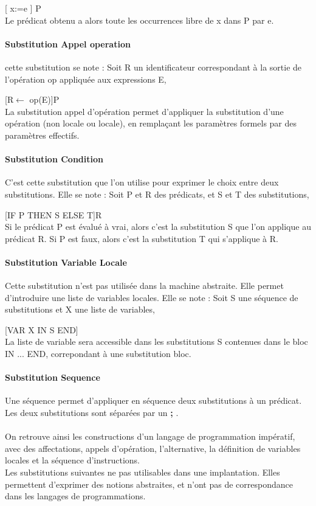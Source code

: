 [ x:=e ] P \\
Le prédicat obtenu a alors toute les occurrences libre de x dans P par e.

\paragraph{Substitution Appel operation}
cette substitution se note : Soit R un identificateur correspondant à la sortie
de l'opération op appliquée aux expressions E, 

[R$\leftarrow$ op(E)]P\\
La  substitution appel d’opération permet d’appliquer la substitution
d’une opération (non locale ou locale), en remplaçant les paramètres
formels par des paramètres effectifs. 

\paragraph{Substitution Condition}
C'est cette substitution que l'on utilise pour exprimer le choix entre deux
substitutions. Elle se note : Soit P et R des prédicats, et S et T des
substitutions,

[IF P THEN S ELSE T]R \\
Si le prédicat P est évalué à vrai, alors c'est la substitution S que l'on
applique au prédicat R. Si P est faux, alors c'est la substitution T qui
s'applique à R.

\paragraph{Substitution Variable Locale}
Cette substitution n'est pas utilisée dans la machine abstraite. Elle permet
d'introduire une liste de variables locales.
Elle se note : Soit S une séquence de substitutions et X une liste de variables,

[VAR X IN S END]\\
La liste de variable sera accessible dans les substitutions S contenues dans le
bloc IN ... END, correpondant à une substitution bloc.

\paragraph{Substitution Sequence}
Une séquence permet d'appliquer en séquence deux substitutions à un
prédicat. Les deux substitutions sont séparées par un \textbf{;} .

\paragraph{}
On retrouve ainsi les constructions d'un langage de programmation
impératif, avec des affectations, appels d'opération, l'alternative, la
définition de variables locales et la séquence d'instructions.\\
Les substitutions suivantes ne pas utilisables dans une implantation. Elles
permettent d'exprimer des notions abstraites, et n'ont pas de correspondance
dans les langages de programmations.

